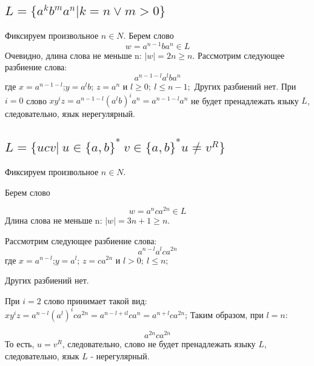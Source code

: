\documentclass[a4paper,12pt]{article}
\begin{document}
\subsection{$L=\{a^kb^ma^n | k = n\vee m > 0\}$}
Фиксируем произвольное $n\in N$.\newline 
Берем слово\newline  $$w = a^{n-1}ba^n\in L$$\newline
Очевидно, длина слова не меньше n: $|w|=2n\geq n$.
\newline
Рассмотрим следующее разбиение слова:
$$ a^{n-1-l}a^lba^n$$
где $x=a^{n-1-l}$;\:$y=a^{l}b$;\: $z=a^{n}$ и $l \geq 0;\:l \leq n-1;$\newline
Других разбиений нет.\newline
При $i = 0$ слово $xy^iz = a^{n-1-l}(a^{l}b)^ia^{n} = a^{n-1-l}a^n  $ не будет пренадлежать языку $L$, следовательно, язык  нерегулярный.\newline
\subsection{$L=\{ucv|\: u \in \{a,b\}^*\:v \in \{a,b\}^* u \neq v^R\}$}
Фиксируем произвольное $n\in N$.

Берем слово

$$w =a^nca^{2n}\in L$$\newline
Длина слова не меньше n: $|w|=3n+1\geq n$.

Рассмотрим следующее разбиение слова:
$$ a^{n-l}a^lca^{2n}$$
где $x=a^{n-l}$;\:$y=a^{l}$;\: $z=ca^{2n}$ и $l > 0;\:l \leq n;$

Других разбиений нет.

При $i = 2$ слово принимает такой вид: $xy^iz = a^{n-l}(a^{l})^ica^{2n} = a^{n-l+il}ca^n = a^{n+l}ca^{2n}  $;\newline
Таким образом, при $l = n$:

$$a^{2n}ca^{2n}$$То есть, $u = v^R $, следовательно, слово не будет пренадлежать языку $L$, следовательно, язык  $L$ - нерегулярный.\newline
\end{document}
